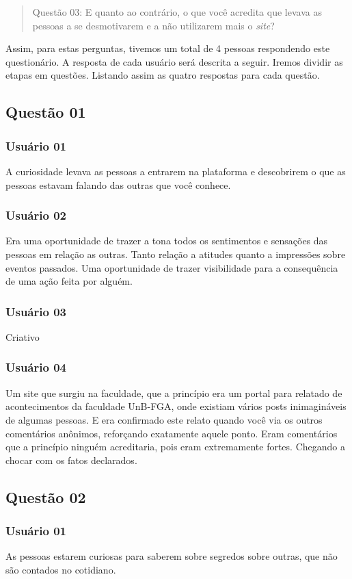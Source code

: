 \begin{quotation}
    Questão 03: E quanto ao contrário, o que você acredita que levava as pessoas a se desmotivarem e a não
    utilizarem mais o \textit{site}?
\end{quotation}

Assim, para estas perguntas, tivemos um total de 4 pessoas respondendo este questionário. A resposta de cada
usuário será descrita a seguir. Iremos dividir as etapas em questões. Listando assim as quatro respostas
para cada questão.


\subsection{Questão 01}
\subsubsection{Usuário 01}
A curiosidade levava as pessoas a entrarem na plataforma e descobrirem o que as
pessoas estavam falando das outras que você conhece.
\subsubsection{Usuário 02}
Era uma oportunidade de trazer a tona todos os sentimentos e sensações das pessoas
em relação as outras. Tanto relação a atitudes quanto a impressões sobre eventos
passados. Uma oportunidade de trazer visibilidade para a consequência de uma ação
feita por alguém.
\subsubsection{Usuário 03}
Criativo
\subsubsection{Usuário 04}
Um site que surgiu na faculdade, que a princípio era um portal para relatado de
acontecimentos da faculdade UnB-FGA, onde existiam vários posts inimagináveis
de algumas pessoas. E era confirmado este relato quando você via os outros comentários
anônimos, reforçando exatamente aquele ponto. Eram comentários que a princípio ninguém
acreditaria, pois eram extremamente fortes. Chegando a chocar com os fatos
declarados.

\subsection{Questão 02}
\subsubsection{Usuário 01}
As pessoas estarem curiosas para saberem sobre segredos sobre outras, que não
são contados no cotidiano.
